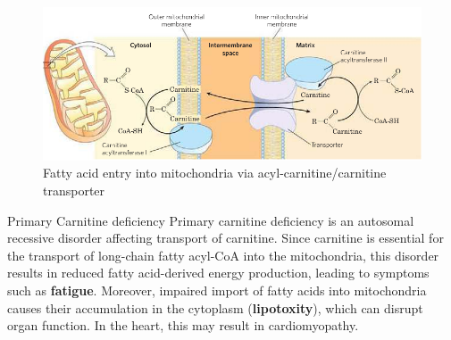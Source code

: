 \documentclass[../main.tex]{subfiles}
\begin{document}
\begin{figure}[H]
	\centering
	\includegraphics[width = 0.8 \textwidth]{FA0_5}
	\caption{Fatty acid entry into mitochondria via acyl-carnitine/carnitine transporter}
\end{figure}

 \begin{RemarkWithTitel}{Primary Carnitine deficiency}
	Primary carnitine deficiency is an autosomal recessive disorder affecting transport of carnitine. Since carnitine is essential for the transport of long-chain fatty acyl-CoA into the mitochondria, this disorder results in reduced fatty acid-derived energy production, leading to symptoms such as \textbf{fatigue}. Moreover, impaired import of fatty acids into mitochondria causes their accumulation in the cytoplasm (\textbf{lipotoxity}), which can disrupt organ function. In the heart, this may result in cardiomyopathy.
\end{RemarkWithTitel}
\end{document}
